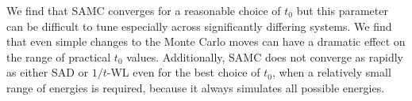 \documentclass[letterpaper,twocolumn,amsmath,amssymb,pre,aps,10pt]{revtex4-1}
\begin{document}
We find that SAMC converges for a reasonable choice of
$t_0$ but this parameter can be difficult to tune especially across
significantly differing systems.  We find that even simple
changes to the Monte Carlo moves can have a dramatic effect on the
range of practical $t_0$ values.  Additionally, SAMC does not
converge as rapidly as either SAD or $1/t$-WL even for the best choice of $t_0$,
when a relatively small range of energies is required, because it always
simulates all possible energies.




\end{document}
